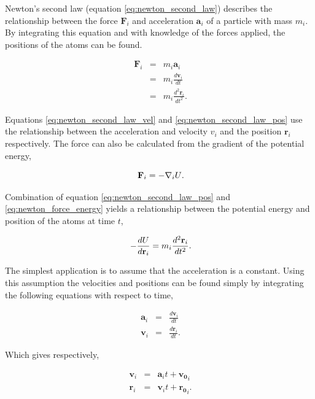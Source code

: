 Newton's second law (equation \ref{eq:newton_second_law}) describes the relationship between the force $\mathbf{F}_i$ and acceleration $\mathbf{a}_i$ of a particle with mass $m_i$.  By integrating this equation and with knowledge of the forces applied, the positions of the atoms can be found.

\begin{eqnarray} \label{eq:newton_second_law}
\ \mathbf{F}_i &=& m_i \mathbf{a}_i \\
\ \label{eq:newton_second_law_vel} &=& m_i \frac{d \mathbf{v}_i}{dt} \\
\ \label{eq:newton_second_law_pos} &=& m_i \frac{d^2 \mathbf{r}_i}{dt^2} .
\end{eqnarray}

Equations \ref{eq:newton_second_law_vel} and \ref{eq:newton_second_law_pos} use the relationship between the acceleration and velocity $v_i$ and the position $\mathbf{r}_i$ respectively.  The force can also be calculated from the gradient of the potential energy,

\begin{equation} \label{eq:newton_force_energy}
\ \mathbf{F}_i = - \nabla_i U \\.
\end{equation}

Combination of equation \ref{eq:newton_second_law_pos} and \ref{eq:newton_force_energy} yields a relationship between the potential energy and position of the atoms at time $t$,

\begin{equation}
\ - \frac{d U}{d \mathbf{r}_i} = m_i \frac{d^2 \mathbf{r}_i}{dt^2} \\.
\end{equation}

The simplest application is to assume that the acceleration is a constant.  Using this assumption the velocities and positions can be found simply by integrating the following equations with respect to time,

\begin{eqnarray}
\ \mathbf{a}_i &=& \frac{d \mathbf{v}_i}{dt} \\
\ \mathbf{v}_i &=& \frac{d \mathbf{r}_i}{dt} .
\end{eqnarray}

Which gives respectively,

\begin{eqnarray} \label{eq:vel_accel}
\ \mathbf{v}_i &=& \mathbf{a}_i t + \mathbf{v_0}_i \\ \label{eq:pos_vel}
\ \mathbf{r}_i &=& \mathbf{v}_i t + \mathbf{r_0}_i .
\end{eqnarray}

